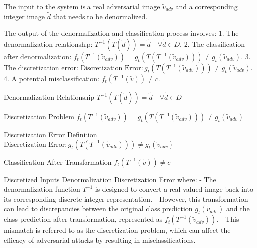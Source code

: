 The input to the system is a real adversarial image $\tilde{v}_{adv}$ and a corresponding integer image $\tilde{d}$ that needs to be denormalized.

The output of the denormalization and classification process involves:
1. The denormalization relationship: $T^{-1}(T(\tilde{d})) = \tilde{d} \quad \forall \tilde{d} \in D$.
2. The classification after denormalization: $f_t(T^{-1}(\tilde{v}_{adv})) = g_t(T(T^{-1}(\tilde{v}_{adv}))) \neq g_t(\tilde{v}_{adv})$.
3. The discretization error: $\text{Discretization Error} : g_t(T(T^{-1}(\tilde{v}_{adv}))) \neq g_t(\tilde{v}_{adv})$.
4. A potential misclassification: $f_t(T^{-1}(\tilde{v})) \neq c$.


Denormalization Relationship
$T^{-1}(T(\tilde{d})) = \tilde{d} \quad \forall \tilde{d} \in D$

Discretization Problem
$f_t(T^{-1}(\tilde{v}_{adv})) = g_t(T(T^{-1}(\tilde{v}_{adv}))) \neq g_t(\tilde{v}_{adv})$

Discretization Error Definition
$\text{Discretization Error} : g_t(T(T^{-1}(\tilde{v}_{adv}))) \neq g_t(\tilde{v}_{adv})$

Classification After Transformation
$f_t(T^{-1}(\tilde{v})) \neq c$


Discretized Inputs Denormalization Discretization Error where:
- The denormalization function $T^{-1}$ is designed to convert a real-valued image back into its corresponding discrete integer representation.
- However, this transformation can lead to discrepancies between the original class prediction $g_t(\tilde{v}_{adv})$ and the class prediction after transformation, represented as $f_t(T^{-1}(\tilde{v}_{adv}))$.
- This mismatch is referred to as the discretization problem, which can affect the efficacy of adversarial attacks by resulting in misclassifications.